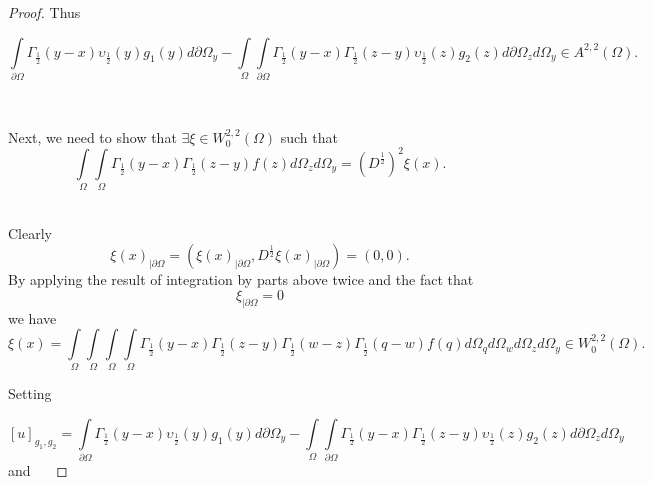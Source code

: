 \documentclass{amsart}%
\theoremstyle{plain}
\numberwithin{equation}{section}
\begin{document}
\begin{proof}
Thus%

\[%
{\displaystyle\int\limits_{\partial\Omega}}
\Gamma_{\frac{1}{2}}\left(  y-x\right)  \upsilon_{\frac{1}{2}}\left(
y\right)  g_{1}\left(  y\right)  d\partial\Omega_{y}-%
{\displaystyle\int\limits_{\Omega}}
{\displaystyle\int\limits_{\partial\Omega}}
\Gamma_{\frac{1}{2}}\left(  y-x\right)  \Gamma_{\frac{1}{2}}\left(
z-y\right)  \upsilon_{\frac{1}{2}}\left(  z\right)  g_{2}(z)d\partial
\Omega_{z}d\Omega_{y}\in A^{2,2}\left(  \Omega\right)  \text{.}%
\]


\ \ 

Next, we need to show that $\exists\xi\in W_{0}^{2,2}\left(  \Omega\right)  $
such that
\[%
{\displaystyle\int\limits_{\Omega}}
{\displaystyle\int\limits_{\Omega}}
\Gamma_{\frac{1}{2}}\left(  y-x\right)  \Gamma_{\frac{1}{2}}\left(
z-y\right)  f(z)d\Omega_{z}d\Omega_{y}=\left(  D^{\frac{1}{2}}\right)  ^{2}%
\xi\left(  x\right)  \text{.}%
\]
\ 

Clearly
\[
\xi\left(  x\right)  _{\mid\partial\Omega}=\left(  \xi\left(  x\right)
_{\mid\partial\Omega},D^{\frac{1}{2}}\xi\left(  x\right)  _{\mid\partial
\Omega}\right)  =\left(  0,0\right)  \text{.}%
\]
By applying the result of integration by parts above twice and the fact that%
\[
\xi_{\mid\partial\Omega}=0
\]
we have \ \
\[
\xi\left(  x\right)  =%
{\displaystyle\int\limits_{\Omega}}
{\displaystyle\int\limits_{\Omega}}
{\displaystyle\int\limits_{\Omega}}
{\displaystyle\int\limits_{\Omega}}
\Gamma_{\frac{1}{2}}\left(  y-x\right)  \Gamma_{\frac{1}{2}}\left(
z-y\right)  \Gamma_{\frac{1}{2}}\left(  w-z\right)  \Gamma_{\frac{1}{2}%
}\left(  q-w\right)  f\left(  q\right)  d\Omega_{q}d\Omega_{w}d\Omega
_{z}d\Omega_{y}\in W_{0}^{2,2}\left(  \Omega\right)  \text{.}%
\]


Setting \ %

\[
\left[  u\right]  _{g_{1},g_{2}}=%
{\displaystyle\int\limits_{\partial\Omega}}
\Gamma_{\frac{1}{2}}\left(  y-x\right)  \upsilon_{\frac{1}{2}}\left(
y\right)  g_{1}\left(  y\right)  d\partial\Omega_{y}-%
{\displaystyle\int\limits_{\Omega}}
{\displaystyle\int\limits_{\partial\Omega}}
\Gamma_{\frac{1}{2}}\left(  y-x\right)  \Gamma_{\frac{1}{2}}\left(
z-y\right)  \upsilon_{\frac{1}{2}}\left(  z\right)  g_{2}(z)d\partial
\Omega_{z}d\Omega_{y}%
\]
and \ \ %


\end{proof}
\end{document}
